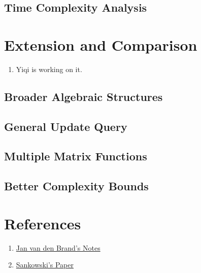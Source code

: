 \documentclass[12pt]{article}
\begin{document}
\subsection{Time Complexity Analysis}

\section{Extension and Comparison}

\begin{enumerate}
    \item Yiqi is working on it.
\end{enumerate}

\subsection{Broader Algebraic Structures}
\subsection{General Update Query}
\subsection{Multiple Matrix Functions}
\subsection{Better Complexity Bounds}

\section*{References}

\begin{enumerate}
    \item \href{https://www.dropbox.com/scl/fi/zjfbk8dbxbzcn05dr8l11/fall22_daa_lecturenotes.pdf?rlkey=g6z7z1hvj7jknvlpy1s3dqcjw&e=1&st=13r18doq&dl=0}{Jan van den Brand's Notes}
    \item \href{https://www.dropbox.com/scl/fi/5w4k0lg0u8e36zugapp6c/Sankowski-COCOON-05-subquadratic-dynamic-distances.pdf?rlkey=5eahwsl7a49kwxyvlr7yqyoz3&e=2&st=d3zo7owc&dl=0}{Sankowski's Paper}
\end{enumerate}
\end{document}
